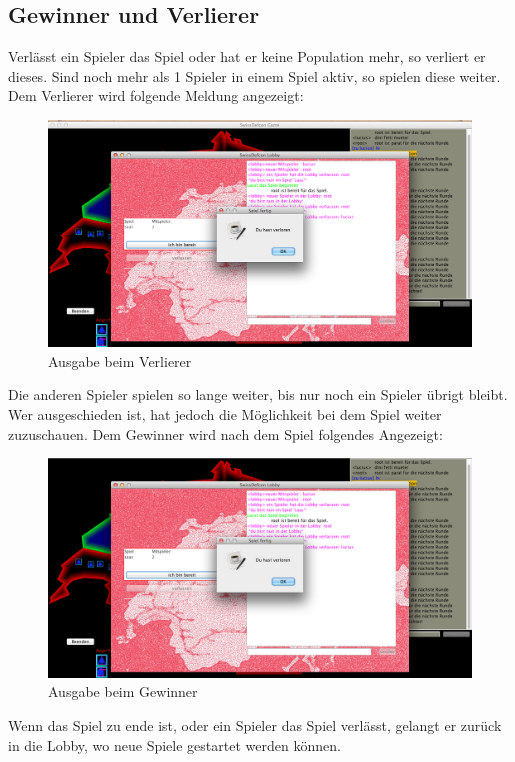 \documentclass[ngerman, 12pt, pdftex]{scrartcl}[2006/07/30]
\begin{document}
\newpage

\subsection{Gewinner und Verlierer}

Verlässt ein Spieler das Spiel oder hat er keine Population mehr, so verliert er dieses. Sind noch mehr als 1 Spieler in einem Spiel aktiv, so spielen diese weiter.
Dem Verlierer wird folgende Meldung angezeigt:

\begin{figure}[h]
\centering
\includegraphics[scale=0.29]{spiel/verloren.png}
\caption{Ausgabe beim Verlierer}
\end{figure}

Die anderen Spieler spielen so lange weiter, bis nur noch ein Spieler übrigt bleibt. Wer ausgeschieden ist, hat jedoch die Möglichkeit bei dem Spiel weiter zuzuschauen.
Dem Gewinner wird nach dem Spiel folgendes Angezeigt:

\begin{figure}[h]
\centering
\includegraphics[scale=0.29]{spiel/gewonnen.png}
\caption{Ausgabe beim Gewinner}
\end{figure}

Wenn das Spiel zu ende ist, oder ein Spieler das Spiel verlässt, gelangt er zurück in die Lobby, wo neue Spiele gestartet werden können.
\end{document}
